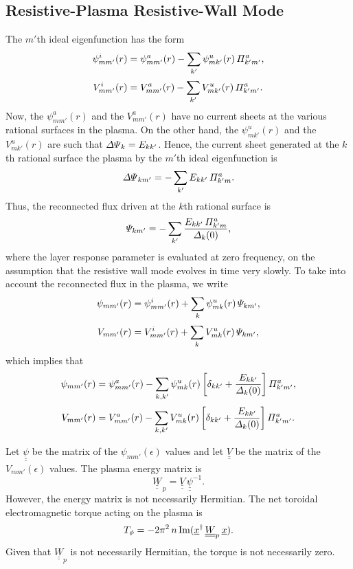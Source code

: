 \documentclass[12pt,prb,aps,notitlepage]{revtex4-1}
\begin{document}
\subsection{Resistive-Plasma Resistive-Wall Mode}
The $m'$th ideal eigenfunction has the form
\begin{align}
\psi^i_{mm'}(r) &= \psi^a_{mm'}(r) - \sum_{k'}\psi^u_{mk'}(r)\,{\mit\Pi}_{k'm'}^a,\\[0.5ex]
V^i_{mm'}(r) &=  V^a_{mm'}(r) - \sum_{k'} V^u_{mk'}(r)\,{\mit\Pi}_{k'm'}^a.
\end{align}
Now, the $\psi^a_{mm'}(r)$ and the $V^a_{mm'}(r)$ have no current sheets at the various rational surfaces in the plasma. 
On the other hand, the $\psi^u_{mk'}(r)$ and  the $V^u_{mk'}(r)$ are such that ${\mit\Delta\Psi}_{k}= E_{kk'}$. Hence, the current sheet generated at the $k$th rational surface the plasma by the $m'$th ideal eigenfunction is
\begin{equation}
{\mit\Delta\Psi}_{km'} = -\sum_{k'}E_{kk'}\,{\mit\Pi}_{k'm}^a.
\end{equation}
Thus, the reconnected flux driven at the $k$th rational surface is
\begin{equation}
{\mit\Psi}_{km'}= -\sum_{k'}\frac{E_{kk'}\,{\mit\Pi}_{k'm}^a}{{\mit\Delta}_k(0)},
\end{equation}
where the layer response parameter is evaluated at zero frequency, on the assumption that the resistive wall mode evolves in time very slowly. 
To take into account the reconnected flux in the plasma, we write
\begin{align}
\psi_{mm'}(r) &=\psi^i_{mm'}(r) + \sum_k \psi^u_{mk}(r)\,{\mit\Psi}_{km'},\\[0.5ex]
V_{mm'}(r) &=  V^i_{mm'}(r) + \sum_k V^u_{mk}(r)\,{\mit\Psi}_{km'},
\end{align}
which implies that
\begin{align}
\psi_{mm'}(r) &= \psi^a_{mm'}(r) - \sum_{k,k'}\psi^u_{mk}(r)\left[\delta_{kk'}+ \frac{E_{kk'}}{{\mit\Delta}_k(0)}\right]{\mit\Pi}_{k'm'}^a,\\[0.5ex]
V_{mm'}(r) &=  V^a_{mm'}(r) - \sum_{k,k'} V^u_{mk}(r)\left[\delta_{kk'}+ \frac{E_{kk'}}{{\mit\Delta}_k(0)}\right]{\mit\Pi}_{k'm'}^a.
\end{align}

Let $\underline{\underline{\psi}}$ be the matrix of the $\psi_{mm'}(\epsilon)$ values and let $\underline{\underline{V}}$ be the matrix of the
$V_{mm'}(\epsilon)$ values. The plasma energy matrix is
\begin{equation}
\underline{\underline{W}}_{\,p} = \underline{\underline{V}}\,\underline{\underline{\psi}}^{-1}.
\end{equation}
However, the energy matrix is not necessarily  Hermitian. The net toroidal electromagnetic torque acting on the plasma is
\begin{equation}
T_\phi = -2\pi^2\,n\,{\rm Im}(\underline{x}^\dag\,\underline{\underline{W}}_p\,\underline{x}).
\end{equation}
Given that $\underline{\underline{W}}_p$ is not necessarily Hermitian, the torque is not necessarily zero. 
\end{document}
